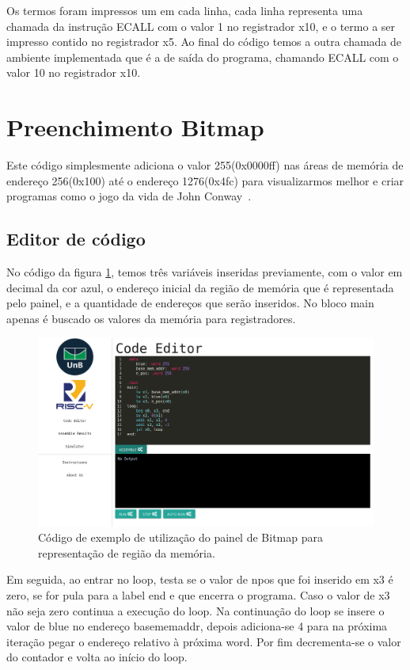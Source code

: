 	Os termos foram impressos um em cada linha, cada linha representa uma chamada da instrução ECALL com o valor 1 no registrador x10, e o termo a ser impresso contido no registrador x5. Ao final do código temos a outra chamada de ambiente implementada que é a de saída do programa, chamando ECALL com o valor 10 no registrador x10.


\section{Preenchimento Bitmap}

	Este código simplesmente adiciona o valor 255(0x0000ff) nas áreas de memória de endereço 256(0x100) até o endereço 1276(0x4fc) para visualizarmos melhor e criar programas como o jogo da vida de John Conway~\cite{conway1970game}.

\subsection{Editor de código}

	No código da figura \ref{fig:codigo-bitmap}, temos três variáveis inseridas previamente, com o valor em decimal da cor azul, o endereço inicial da região de memória que é representada pelo painel, e a quantidade de endereços que serão inseridos. No bloco main apenas é buscado os valores da memória para registradores.
	
	\begin{figure}[h!]
	  \centering
	  \includegraphics[width=14cm]{img/codigo_bitmap.png}
	  \caption{Código de exemplo de utilização do painel de Bitmap para representação de região da memória.}
	  \label{fig:codigo-bitmap}
	\end{figure}

	Em seguida, ao entrar no loop, testa se o valor de n\textunderscore pos que foi inserido em x3 é zero, se for pula para a label end e que encerra o programa. Caso o valor de x3 não seja zero continua a execução do loop. Na continuação do loop se insere o valor de blue no endereço base\textunderscore mem\textunderscore addr, depois adiciona-se 4 para na próxima iteração pegar o endereço relativo à próxima word. Por fim decrementa-se o valor do contador e volta ao início do loop.


